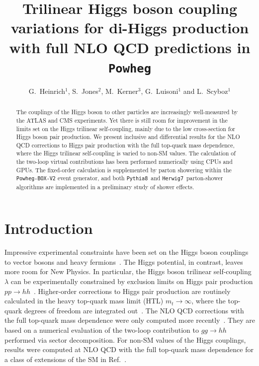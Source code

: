 \documentclass[a4paper]{jpconf}
\newcommand{\pythia}{\texttt{Pythia8}}
\newcommand{\herwig}{\texttt{Herwig7}}
\begin{document}
\title{Trilinear Higgs boson coupling variations for di-Higgs production with full NLO QCD predictions in \texttt{Powheg}}

\author{G.~Heinrich$^1$, S.~Jones$^2$, M.~Kerner$^3$, G.~Luisoni$^1$ and L.~Scyboz$^1$}

\address{$^1$ Max-Planck-Institut f\"ur Physik, F\"ohringer Ring 6, 80805 M\"unchen, Germany}
\address{$^2$ Theoretical Physics Department, CERN, Geneva, Switzerland}
\address{$^3$ Physik-Institut, Universit\"at Z\"urich, Winterthurerstrasse 190, 8057 Z\"urich, Switzerland}


\begin{abstract}
The couplings of the Higgs boson to other particles are increasingly well-measured by the ATLAS and CMS experiments. Yet there is still room for improvement in the limits set on the Higgs trilinear self-coupling, mainly due to the low cross-section for Higgs boson pair production. We present inclusive and differential results for the NLO QCD corrections to Higgs pair production with the full top-quark mass dependence, where the Higgs trilinear self-coupling is varied to non-SM values. The calculation of the two-loop virtual contributions has been performed numerically using CPUs and GPUs. The fixed-order calculation is supplemented by parton showering within the \texttt{Powheg-BOX-V2} event generator, and both \pythia~and \herwig~parton-shower algorithms are implemented in a preliminary study of shower effects.
\end{abstract}


\section{Introduction}

Impressive experimental constraints have been set on the Higgs boson couplings to vector bosons and heavy fermions~\cite{Khachatryan:2016vau,Aaboud:2017vzb,Sirunyan:2018koj,Sirunyan:2018sgc}. The Higgs potential, in contrast, leaves more room for New Physics. In particular, the Higgs boson trilinear self-coupling $\lambda$ can be experimentally constrained by exclusion limits on Higgs pair production $pp \to hh$~\cite{Sirunyan:2018two,ATLAS-CONF-2018-043}.
Higher-order corrections to Higgs pair production are routinely calculated in the heavy top-quark mass limit (HTL) $m_t \to \infty$, where the top-quark degrees of freedom are integrated out~\cite{Dawson:1998py,deFlorian:2016uhr}. The NLO QCD corrections with the full top-quark mass dependence were only computed more recently~\cite{Borowka:2016ehy,Borowka:2016ypz,Baglio:2018lrj}. They are based on a numerical evaluation of the two-loop contribution to $gg \to hh$ performed via sector decomposition. For non-SM values of the Higgs couplings, results were computed at NLO QCD with the full top-quark mass dependence for a class of extensions of the SM in Ref.~\cite{Buchalla:2018yce}.
\end{document}
